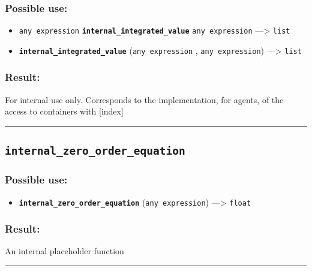 \documentclass[]{book}
\providecommand{\tightlist}{%
  \setlength{\itemsep}{0pt}\setlength{\parskip}{0pt}}
\theoremstyle{definition}
\theoremstyle{definition}
\theoremstyle{definition}
\theoremstyle{remark}
\begin{document}
\subsubsection{Possible use:}\label{possible-use-280}

\begin{itemize}
\tightlist
\item
  \texttt{any\ expression} \textbf{\texttt{internal\_integrated\_value}}
  \texttt{any\ expression} ---\textgreater{} \texttt{list}
\item
  \textbf{\texttt{internal\_integrated\_value}}
  (\texttt{any\ expression} , \texttt{any\ expression})
  ---\textgreater{} \texttt{list}
\end{itemize}

\subsubsection{Result:}\label{result-270}

For internal use only. Corresponds to the implementation, for agents, of
the access to containers with {[}index{]}

\begin{center}\rule{0.5\linewidth}{\linethickness}\end{center}

\subsection{\texorpdfstring{\texttt{internal\_zero\_order\_equation}}{internal\_zero\_order\_equation}}\label{internal_zero_order_equation}

\subsubsection{Possible use:}\label{possible-use-281}

\begin{itemize}
\tightlist
\item
  \textbf{\texttt{internal\_zero\_order\_equation}}
  (\texttt{any\ expression}) ---\textgreater{} \texttt{float}
\end{itemize}

\subsubsection{Result:}\label{result-271}

An internal placeholder function

\begin{center}\rule{0.5\linewidth}{\linethickness}\end{center}
\end{document}
